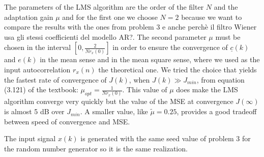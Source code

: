 \documentclass{article}
\renewcommand{\vec}[1]{\underline{#1}}
\newcommand{\E}[1]{\operatorname{E}\left[#1\right]}
\newcommand{\norm}[1]{\left\lVert#1\right\rVert}
\newcommand{\abs}[1]{\left|#1\right|}
\begin{document}
The parameters of the LMS algorithm are the order of the filter $N$
and the adaptation gain $\mu$ and for the first one we choose $N = 2$
because we want to compare the results with the ones from problem 3
{\color{red} e anche perchè il filtro Wiener usa gli stessi
  coefficienti del modello AR?}.  The second parameter $\mu$ must be
chosen in the interval $\left[0,\frac{2}{Nr_x(0)}\right]$ in order to
ensure the convergence of $\vec{c}(k)$ and $e(k)$ in the mean sense
and in the mean square sense,
where we used as the input autocorrelation $r_x(n)$ {\color{red} the
  theoretical one}.  We tried the choice that yields the fastest rate
of convergence of $J(k)$, when $J(k) \gg J_{min}$, from equation
(3.121) of the textbook: $\mu_{opt} = \frac{1}{Nr_x(0)}$. This value
of $\mu$ does make the LMS algorithm converge very quickly but the
value of the MSE at convergence $J(\infty)$ is {\color{red} almost 5
  dB} over $J_{min}$. A smaller value, like $\tilde{\mu} = 0.25$,
  provides a good tradeoff between speed of convergence and MSE.

  The input signal $x(k)$ is generated with the same seed value of
  problem 3 for the random number generator so it is the same
  realization.
\end{document}
